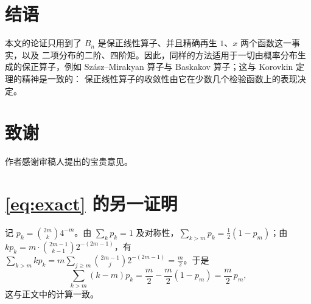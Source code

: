 \documentclass{mojing-paper}
\begin{document}
\section{结语}

本文的论证只用到了 $B_n$ 是保正线性算子、并且精确再生 $1$、$x$ 两个函数这一事实，以及
二项分布的二阶、四阶矩。因此，同样的方法适用于一切由概率分布生成的保正算子，例如
Sz\'asz--Mirakyan 算子与 Baskakov 算子；这与 Korovkin 定理\cite{korovkin1953}的精神是一致的：
保正线性算子的收敛性由它在少数几个检验函数上的表现决定。

\section*{致谢}
作者感谢审稿人提出的宝贵意见。

\printreferences

\appendix
\section{\cref{eq:exact} 的另一证明}

记 $p_k=\binom{2m}{k}4^{-m}$。由 $\sum_kp_k=1$ 及对称性，$\sum_{k>m}p_k=\frac12(1-p_m)$；由
$kp_k=m\cdot\binom{2m-1}{k-1}2^{-(2m-1)}$，有
$\sum_{k>m}kp_k=m\sum_{j\ge m}\binom{2m-1}{j}2^{-(2m-1)}=\frac m2$。于是
\[
  \sum_{k>m}(k-m)p_k=\frac m2-\frac m2(1-p_m)=\frac m2\,p_m ,
\]
这与正文中的计算一致。
\end{document}
